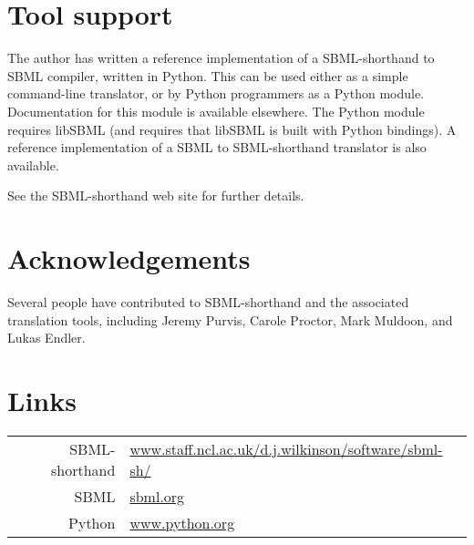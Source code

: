 \documentclass[11pt,a4paper]{article}
\begin{document}
\section{Tool support}

The author has written a reference implementation of a SBML-shorthand
to SBML compiler, written in Python. This can be
used either as a simple command-line translator, or by Python
programmers as a Python module. Documentation for this module is
available elsewhere. The Python module requires libSBML (and requires that
libSBML is built with Python bindings).
A reference implementation of a SBML to SBML-shorthand translator is
also available.

See the SBML-shorthand web site for further details.

\section{Acknowledgements}

Several people have contributed to SBML-shorthand and the associated
translation tools, including Jeremy Purvis, Carole Proctor, Mark
Muldoon, and Lukas Endler.


\section{Links}

\begin{tabular}{rl}
SBML-shorthand & {\small
\href{http://www.staff.ncl.ac.uk/d.j.wilkinson/software/sbml-sh/}{\url{www.staff.ncl.ac.uk/d.j.wilkinson/software/sbml-sh/}}
}\\
SBML & \href{http://sbml.org/}{\url{sbml.org}} \\
Python & \href{http://www.python.org/}{\url{www.python.org}}
\end{tabular}
\end{document}
